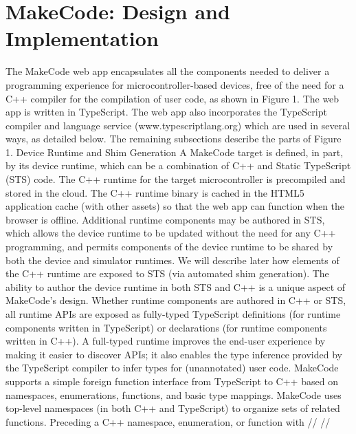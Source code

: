 \section{MakeCode: Design and Implementation}
\label{sec:makecode}

The MakeCode web app encapsulates all the components needed to deliver a programming experience for microcontroller-based devices, free of the need for a C++ compiler for the compilation of user code, as shown in Figure 1. The web app is written in TypeScript. The web app also incorporates the TypeScript compiler and language service (www.typescriptlang.org) which are used in several ways, as detailed below. The remaining subsections describe the parts of Figure 1.
Device Runtime and Shim Generation
A MakeCode target is defined, in part, by its device runtime, which can be a combination of C++ and Static TypeScript (STS) code. The C++ runtime for the target microcontroller is precompiled and stored in the cloud. The C++ runtime binary is cached in the HTML5 application cache (with other assets) so that the web app can function when the browser is offline. Additional runtime components may be authored in STS, which allows the device runtime to be updated without the need for any C++ programming, and permits components of the device runtime to be shared by both the device and simulator runtimes.  We will describe later how elements of the C++ runtime are exposed to STS (via automated shim generation).  The ability to author the device runtime in both STS and C++ is a unique aspect of MakeCode’s design. 
Whether runtime components are authored in C++ or STS, all runtime APIs are exposed as fully-typed TypeScript definitions (for runtime components written in TypeScript) or declarations (for runtime components written in C++). A full-typed runtime improves the end-user experience by making it easier to discover APIs; it also enables the type inference provided by the TypeScript compiler to infer types for (unannotated) user code. 
MakeCode supports a simple foreign function interface from TypeScript to C++ based on namespaces, enumerations, functions, and basic type mappings. MakeCode uses top-level namespaces (in both C++ and TypeScript) to organize sets of related functions.  Preceding a C++ namespace, enumeration, or function with //%
//%
